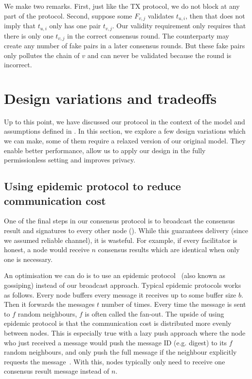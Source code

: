 We make two remarks.
First, just like the TX protocol, we do not block at any part of the protocol.
Second, suppose some $F_{v, j}$ validates $t_{u, i}$, then that does not imply that $t_{u, i}$ only has one pair $t_{v, j}$.
Our validity requirement only requires that there is only one $t_{v, j}$ in the correct consensus round.
The counterparty may create any number of fake pairs in a later consensus rounds.
But these fake pairs only pollutes the chain of $v$ and can never be validated because the round is incorrect.

\section{Design variations and tradeoffs}
\label{sec:tradeoffs}

Up to this point,
we have discussed our protocol in the context of the model and assumptions defined in .
In this section, 
we explore a few design variations which we can make, some of them require a relaxed version of our original model.
They enable better performance, allow us to apply our design in the fully permissionless setting and improves privacy.

\subsection{Using epidemic protocol to reduce communication cost}
One of the final steps in our consensus protocol is to broadcast the consensus result and signatures to every other node ().
While this guarantees delivery (since we assumed reliable channel), it is wasteful.
For example, if every facilitator is honest, a node would receive $n$ consensus results which are identical when only one is necessary.

An optimisation we can do is to use an epidemic protocol~\cite{eugster2004epidemic} (also known as gossiping) instead of our broadcast approach.
Typical epidemic protocols works as follows.
Every node buffers every message it receives up to some buffer size $b$.
Then it forwards the messages $t$ number of times.
Every time the message is sent to $f$ random neighbours, $f$ is often called the fan-out.
The upside of using epidemic protocol is that the communication cost is distributed more evenly between nodes.
This is especially true with a lazy push approach where the node who just received a message would push the message ID (e.g. digest) to its $f$ random neighbours,
and only push the full message if the neighbour explicitly requests the message~\cite{leitao2007epidemic}.
With this, nodes typically only need to receive one consensus result message instead of $n$.

